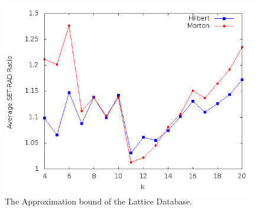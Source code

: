 \documentclass[10pt]{article}
\begin{document}
\begin{figure}
\begin{center}
\includegraphics[scale=0.5]{LatGra2.png}
\caption{The Approximation bound of the Lattice Database.}
\label{approx-lattice}
\end{center}
\end{figure}



\end{document}

